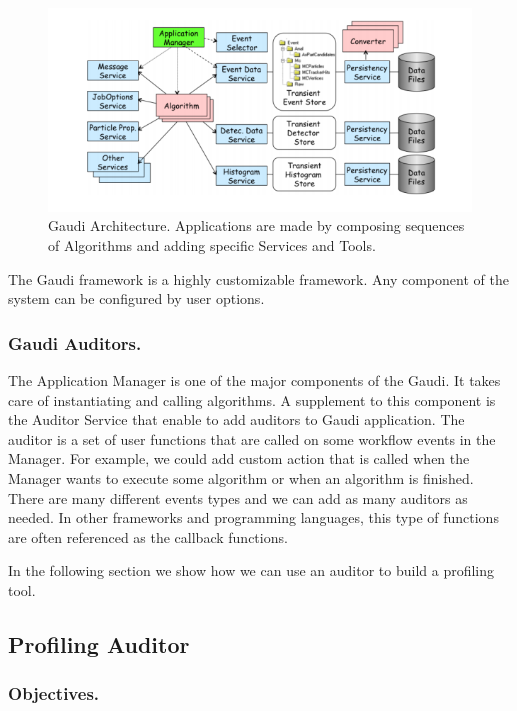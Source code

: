 \documentclass[a4paper]{jpconf}
\begin{document}
\begin{figure}[H]
\begin{minipage}{\textwidth}
\includegraphics[width=\textwidth]{figs/fig07.png}
\caption{\label{fig07}Gaudi Architecture. Applications are made by composing sequences of Algorithms and adding specific Services and Tools.}
\end{minipage}
\end{figure}

The Gaudi framework is a highly customizable framework. Any component of the system can be configured by user  options. 

\subsubsection{Gaudi Auditors.}

The Application Manager is one of the major components of the Gaudi. It takes care of instantiating and calling algorithms. A supplement to this component  is the Auditor Service that enable to add auditors to  Gaudi application. The auditor is a set of user functions that are called on some workflow events in the Manager. For example, we could add custom action that is called when the Manager wants to execute some algorithm or when an algorithm is finished.  There are many different events types and we can add as many auditors as needed. In other frameworks and programming languages, this type of functions are often referenced as the callback functions.

In the following section we show how we can use an auditor to build a profiling tool.

\subsection{Profiling Auditor}

\subsubsection{Objectives.}
\end{document}
